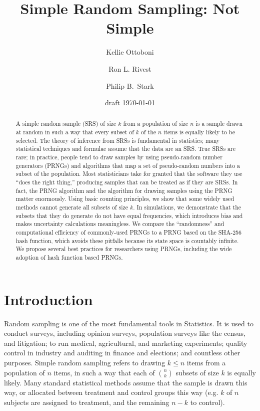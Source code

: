 \documentclass[12pt]{article}
\begin{document}
\title{Simple Random Sampling: Not Simple}
\author{Kellie Ottoboni
\and
Ron L. Rivest
\and
Philip B.~Stark 
}

\date{draft \today}




\maketitle

\begin{abstract}
\small
A simple random sample (SRS) of size $k$ from a population of size $n$ is a sample drawn 
at random in such a way that every subset of $k$ of the $n$ items is equally likely to be selected. 
The theory of inference from SRSs is fundamental in statistics;
many statistical techniques and formulae assume that the data are an SRS.
True SRSs are rare; in practice, people tend to draw samples by using pseudo-random number generators 
(PRNGs) and algorithms that map a set of pseudo-random numbers into a subset of the population. 
Most statisticians take for granted that the software they use ``does the right thing,''
producing samples that can be treated as if they are SRSs.
In fact, the PRNG algorithm and the algorithm for drawing samples using the PRNG matter
enormously.
Using basic counting principles, we show that some widely used methods cannot generate all subsets of size $k$.
In simulations, we demonstrate that the subsets that they do generate do not have equal frequencies, which
introduces bias and makes uncertainty calculations meaningless.
We compare the ``randomness'' and computational efficiency of commonly-used PRNGs to a PRNG 
based on the SHA-256 hash function, which avoids these pitfalls because its state space is countably infinite.
We propose several best practices for researchers using PRNGs, including the wide adoption of hash function based PRNGs.
\end{abstract}

\section{Introduction}
Random sampling is one of the most fundamental tools in Statistics.
It is used to conduct surveys, including opinion surveys, population surveys like the census, and litigation; 
to run medical, agricultural, and marketing experiments; 
quality control in industry and auditing in finance and elections;
and countless other purposes.
Simple random sampling refers to drawing $k \leq n$ items from a population of $n$ items,
in such a way that each of ${n \choose k}$ subsets of size $k$ is equally likely.
Many standard statistical methods assume that the sample is drawn this way, 
or allocated between treatment and control groups this way
(e.g. $k$ of $n$ subjects are assigned to treatment, and the remaining $n-k$ to control).
\end{document}
